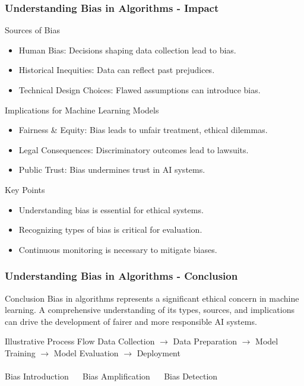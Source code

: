 \documentclass{beamer}
\begin{document}
\begin{frame}[fragile]
    \frametitle{Understanding Bias in Algorithms - Impact}
    \begin{block}{Sources of Bias}
        \begin{itemize}
            \item Human Bias: Decisions shaping data collection lead to bias.
            \item Historical Inequities: Data can reflect past prejudices.
            \item Technical Design Choices: Flawed assumptions can introduce bias.
        \end{itemize}
    \end{block}

    \begin{block}{Implications for Machine Learning Models}
        \begin{itemize}
            \item Fairness \& Equity: Bias leads to unfair treatment, ethical dilemmas.
            \item Legal Consequences: Discriminatory outcomes lead to lawsuits.
            \item Public Trust: Bias undermines trust in AI systems.
        \end{itemize}
    \end{block}
    
    \begin{block}{Key Points}
        \begin{itemize}
            \item Understanding bias is essential for ethical systems.
            \item Recognizing types of bias is critical for evaluation.
            \item Continuous monitoring is necessary to mitigate biases.
        \end{itemize}
    \end{block}
\end{frame}

\begin{frame}[fragile]
    \frametitle{Understanding Bias in Algorithms - Conclusion}
    \begin{block}{Conclusion}
        Bias in algorithms represents a significant ethical concern in machine learning. A comprehensive understanding of its types, sources, and implications can drive the development of fairer and more responsible AI systems.
    \end{block}
    
    \begin{block}{Illustrative Process Flow}
        Data Collection $\to$ Data Preparation $\to$ Model Training $\to$ Model Evaluation $\to$ Deployment \\ 
        \quad \downarrow \\
        Bias Introduction $\quad$ Bias Amplification $\quad$ Bias Detection
    \end{block}
\end{frame}
\end{document}
